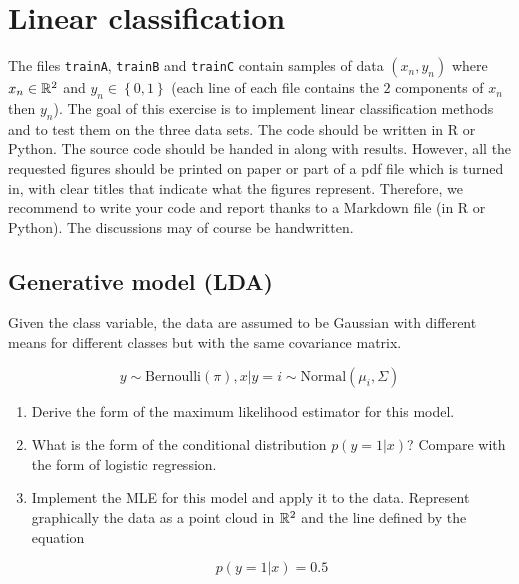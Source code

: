 \documentclass[a4paper, 11pt]{report}
\begin{document}
\pagebreak
\chapter{Linear classification}

The files \texttt{trainA}, \texttt{trainB} and \texttt{trainC} contain samples of data $(x_n, y_n)$ where $x_n \in \mathbb{R}^2$ and $y_n \in \left\{ 0, 1 \right\}$ (each line of each file contains the $2$ components of $x_n$ then $y_n$). The goal of this exercise is to implement linear classification methods and to test them on the three data sets. The code should be written in R or Python. The source code should be handed in along with results. However, all the requested figures should be printed on paper or part of a pdf file which is turned in, with clear titles that indicate what the figures represent. Therefore, we recommend to write your code and report thanks to a Markdown file (in R or Python). The discussions may of course be handwritten.

\section{Generative model (LDA)}

Given the class variable, the data are assumed to be Gaussian with different means for different classes but with the same covariance matrix.

\begin{equation*}
    y \sim \text{Bernoulli} \left( \pi \right), x|y = i \sim \text{Normal} \left( \mu_{i}, \Sigma \right)
\end{equation*}

\begin{enumerate}[label=\alph*]
    \item Derive the form of the maximum likelihood estimator for this model.
    
    \item What is the form of the conditional distribution $p \left( y = 1 | x \right)$? Compare with the form of logistic regression.
    
    \item Implement the MLE for this model and apply it to the data. Represent graphically the data as a point cloud in $\mathbb{R}^{2}$ and the line defined by the equation
    
    \begin{equation*}
        p \left( y = 1 | x \right) = 0.5
    \end{equation*}
\end{enumerate}
\end{document}
